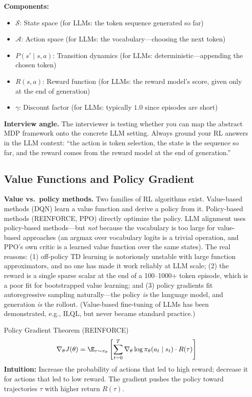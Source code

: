 \textbf{Components:}
\begin{itemize}
    \item $\mathcal{S}$: State space (for LLMs: the token sequence generated so far)
    \item $\mathcal{A}$: Action space (for LLMs: the vocabulary---choosing the next token)
    \item $P(s' \mid s, a)$: Transition dynamics (for LLMs: deterministic---appending the chosen token)
    \item $R(s, a)$: Reward function (for LLMs: the reward model's score, given only at the end of generation)
    \item $\gamma$: Discount factor (for LLMs: typically $1.0$ since episodes are short)
\end{itemize}

\textbf{Interview angle.} The interviewer is testing whether you can map the abstract MDP framework onto the concrete LLM setting. Always ground your RL answers in the LLM context: ``the action is token selection, the state is the sequence so far, and the reward comes from the reward model at the end of generation.''

\subsection{Value Functions and Policy Gradient}

\textbf{Value vs.\ policy methods.} Two families of RL algorithms exist. Value-based methods (DQN) learn a value function and derive a policy from it. Policy-based methods (REINFORCE, PPO) directly optimize the policy. LLM alignment uses policy-based methods---but \textit{not} because the vocabulary is too large for value-based approaches (an argmax over vocabulary logits is a trivial operation, and PPO's own critic is a learned value function over the same states). The real reasons: (1) off-policy TD learning is notoriously unstable with large function approximators, and no one has made it work reliably at LLM scale; (2) the reward is a single sparse scalar at the end of a 100--1000+ token episode, which is a poor fit for bootstrapped value learning; and (3) policy gradients fit autoregressive sampling naturally---the policy \textit{is} the language model, and generation \textit{is} the rollout. (Value-based fine-tuning of LLMs has been demonstrated, e.g., ILQL, but never became standard practice.)

\begin{mathresult}{Policy Gradient Theorem (REINFORCE)}
\begin{equation}
\nabla_\theta J(\theta) = \E_{\tau \sim \pi_\theta}\left[\sum_{t=0}^{T} \nabla_\theta \log \pi_\theta(a_t \mid s_t) \cdot R(\tau)\right]
\end{equation}
\textbf{Intuition:} Increase the probability of actions that led to high reward; decrease it for actions that led to low reward. The gradient pushes the policy toward trajectories $\tau$ with higher return $R(\tau)$.
\end{mathresult}

